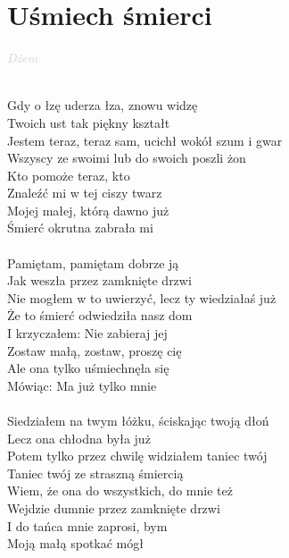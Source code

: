 \documentclass[a5paper, 10pt]{book}
\begin{document}
\section{Uśmiech śmierci}\textcolor{lightgray}{\textit{Dżem}}\\~\\
\begin{minipage}[t]{0.7\textwidth}
Gdy o łzę uderza łza, znowu widzę\\
Twoich ust tak piękny kształt\\
Jestem teraz, teraz sam, ucichł wokół szum i gwar\\
Wszyscy ze swoimi lub do swoich poszli żon\\
\hspace*{4mm}Kto pomoże teraz, kto\\
\hspace*{4mm}Znaleźć mi w tej ciszy twarz\\
\hspace*{4mm}Mojej małej, którą dawno już\\
\hspace*{4mm}Śmierć okrutna zabrała mi\\
\\
Pamiętam, pamiętam dobrze ją\\
Jak weszła przez zamknięte drzwi\\
Nie mogłem w to uwierzyć, lecz ty wiedziałaś już\\
Że to śmierć odwiedziła nasz dom\\
\hspace*{4mm}I krzyczałem: Nie zabieraj jej\\
\hspace*{4mm}Zostaw małą, zostaw, proszę cię\\
\hspace*{4mm}Ale ona tylko uśmiechnęła się\\
\hspace*{4mm}Mówiąc: Ma już tylko mnie\\
\\
Siedziałem na twym łóżku, ściskając twoją dłoń\\
Lecz ona chłodna była już\\
Potem tylko przez chwilę widziałem taniec twój\\
Taniec twój ze straszną śmiercią\\
\hspace*{4mm}Wiem, że ona do wszystkich, do mnie też\\
\hspace*{4mm}Wejdzie dumnie przez zamknięte drzwi\\
\hspace*{4mm}I do tańca mnie zaprosi, bym\\
\hspace*{4mm}Moją małą spotkać mógł\\
\end{minipage}
\end{document}
